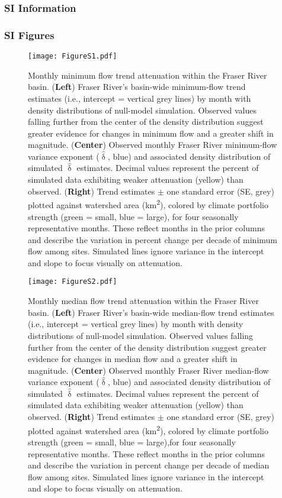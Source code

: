 \documentclass[9pt,twocolumn,twoside,lineno]{pnas-new}
\begin{document}
\subsubsection*{SI Information}

\subsubsection*{SI Figures}

\begin{figure}%
\centering
\texttt{[image: FigureS1.pdf]}
	\caption{Monthly minimum flow trend attenuation within the Fraser River basin. (\textbf{Left}) Fraser River's basin-wide minimum-flow trend estimates (i.e., intercept = vertical grey lines) by month with density distributions of null-model simulation. Observed values falling further from the center of the density distribution suggest greater evidence for changes in minimum flow and a greater shift in magnitude. (\textbf{Center}) Observed monthly Fraser River minimum-flow variance exponent ($\hat{\updelta}$, blue) and associated density distribution of simulated $\hat{\updelta}$ estimates. Decimal values represent the percent of simulated data exhibiting weaker attenuation (yellow) than observed. (\textbf{Right}) Trend estimates $\pm$ one standard error (SE, grey) plotted against watershed area (km\textsuperscript{2}), colored by climate portfolio strength (green = small, blue = large), for four seasonally representative months. These reflect months in the prior columns and describe the variation in percent change per decade of minimum flow among sites. Simulated lines ignore variance in the intercept and slope to focus visually on attenuation.}
\label{fig:S1}
\end{figure}

\begin{figure}%
\centering
\texttt{[image: FigureS2.pdf]}
	\caption{Monthly median flow trend attenuation within the Fraser River basin. (\textbf{Left}) Fraser River's basin-wide median-flow trend estimates (i.e., intercept = vertical grey lines) by month with density distributions of null-model simulation. Observed values falling further from the center of the density distribution suggest greater evidence for changes in median flow and a greater shift in magnitude. (\textbf{Center}) Observed monthly Fraser River median-flow variance exponent ($\hat{\updelta}$, blue) and associated density distribution of simulated $\hat{\updelta}$ estimates. Decimal values represent the percent of simulated data exhibiting weaker attenuation (yellow) than observed. (\textbf{Right}) Trend estimates $\pm$ one standard error (SE, grey) plotted against watershed area (km\textsuperscript{2}), colored by climate portfolio strength (green = small, blue = large),for four seasonally representative months. These reflect months in the prior columns and describe the variation in percent change per decade of median flow among sites. Simulated lines ignore variance in the intercept and slope to focus visually on attenuation.}
\label{fig:S2}
\end{figure}
\end{document}
